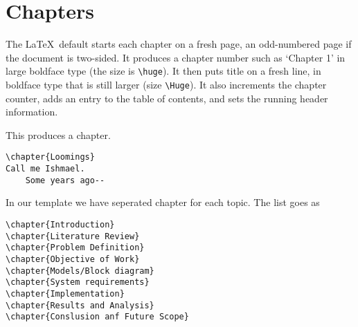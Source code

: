 \section{Chapters}

The \LaTeX \ default starts each chapter on a fresh page, an odd-numbered page if the document is two-sided. It produces a chapter number such as ‘Chapter 1’ in large boldface type (the size is \verb|\huge|). It then puts title on a fresh line, in boldface type that is still larger (size \verb|\Huge|). It also increments the chapter counter, adds an entry to the table of contents, and sets the running header information.

This produces a chapter.

\begin{lstlisting}
\chapter{Loomings}
Call me Ishmael.
    Some years ago--
\end{lstlisting}

In our template we have seperated chapter for each topic. The list goes as

\begin{lstlisting}
\chapter{Introduction}
\chapter{Literature Review}
\chapter{Problem Definition}
\chapter{Objective of Work}
\chapter{Models/Block diagram}
\chapter{System requirements}
\chapter{Implementation}
\chapter{Results and Analysis}
\chapter{Conslusion anf Future Scope}
\end{lstlisting}

